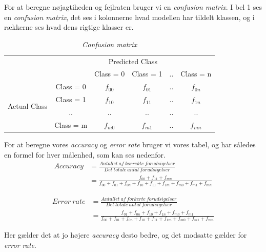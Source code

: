 \documentclass{article}
\begin{document}
For at beregne nøjagtiheden og fejlraten bruger vi en \textit{confusion matrix}. I bel 1 ses en \textit{confusion matrix}, det ses i kolonnerne hvad modellen har tildelt klassen, og i rækkerne ses hvad dens rigtige klasser er. \\

\begin{table}[H]
\begin{center}
\begin{tabular}{cc|c|c|c|c|}
    & \multicolumn{5}{c}{Predicted Class} \\
    \cline{3-6}
     & & Class = 0 & Class = 1 & .. & Class = n \\
    \cline{2-6}
    \multicolumn{1}{c|}{\multirow{4}{*}{Actual Class}} & Class = 0 & $f_{00}$ & $f_{01}$ & .. & $f_{0n}$ \\
    \cline{2-6}
    \multicolumn{1}{c|}{} & Class = 1 & $f_{10}$ & $f_{11}$ & .. & $f_{1n}$ \\
    \cline{2-6}
    \multicolumn{1}{c|}{} & .. & .. & .. & .. & .. \\
    \cline{2-6}
    \multicolumn{1}{c|}{} & Class = m & $f_{m0}$ & $f_{m1}$ & .. & $f_{mn}$ \\
    \cline{2-6}
\end{tabular}
\caption{\textit{Confusion matrix}}
\end{center}
\end{table}

For at beregne vores \textit{accuracy} og \textit{error rate} bruger vi vores tabel, og har således en formel for hver målenhed, som kan ses nedenfor. \\

\begin{align*}
Accuracy &= \frac{Antallet \ af \ korrekte \ forudsigelser}{Det \ totale \ antal \ forudsigelser} \\
         &= \frac{f_{00} + f_{11} + f_{mn}}{f_{00} + f_{01} + f_{0n} + f_{10} + f_{11} + f_{1m} + f_{m0} + f_{m1} + f_{mn}}
\end{align*}

\begin{align*}
Error \ rate &= \frac{Antallet \ af \ forkerte \ forudsigelser}{Det \ totale \ antal \ forudsigelser} \\
           &= \frac{f_{01} + f_{0n} + f_{10} + f_{1n} + f_{m0} + f_{m1}}{f_{00} + f_{01} + f_{0n} + f_{10} + f_{11} + f_{1m} + f_{m0} + f_{m1} + f_{mn}}
\end{align*}

Her gælder det at jo højere \textit{accuracy} desto bedre, og det modsatte gælder for \textit{error rate}. \\
\end{document}
